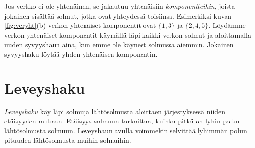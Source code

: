 Jos verkko ei ole yhtenäinen, se jakautuu
yhtenäisiin \emph{komponentteihin},
joista jokainen sisältää solmut, jotka ovat yhteydessä
toisiinsa.
Esimerkiksi kuvan \ref{fig:veryht}(b) verkon
yhtenäiset komponentit ovat $\{1,3\}$ ja $\{2,4,5\}$.
Löydäm\-me verkon yhtenäiset komponentit
käymällä läpi kaikki verkon solmut ja aloittamalla
uuden syvyyshaun aina, kun emme ole käyneet solmussa aiemmin.
Jokainen syvyyshaku löytää yhden yhtenäisen komponentin.

\section{Leveyshaku}

\emph{Leveyshaku} käy läpi solmuja lähtösolmusta aloittaen
järjestyksessä niiden etäisyyden mukaan.
Etäisyys solmuun tarkoittaa, kuinka pitkä on lyhin polku
lähtösolmusta solmuun.
Leveyshaun avulla voimmekin selvittää lyhimmän polun
pituuden lähtösolmusta muihin solmuihin.


